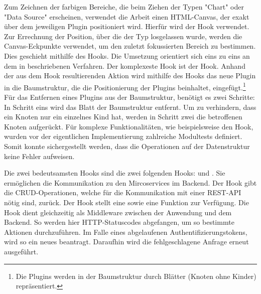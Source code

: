 Zum Zeichnen der farbigen Bereiche, die beim Ziehen der Typen "Chart" oder "Data Source" erscheinen,
verwendet die Arbeit einen HTML-Canvas, der exakt über dem jeweiligen Plugin positioniert wird.
Hierfür wird der  Hook verwendet. Zur Errechnung der Position, über die der Typ
losgelassen wurde, werden die Canvas-Eckpunkte verwendet, um den zuletzt fokussierten Bereich zu bestimmen.
Dies geschieht mithilfe des  Hooks. Die Umsetzung orientiert sich eins zu eins an dem
in  beschriebenen Verfahren. Der komplexeste Hook ist der
 Hook. Anhand der aus dem  Hook resultierenden Aktion wird
mithilfe des  Hooks das neue Plugin in die Baumstruktur, die die Positionierung
der Plugins beinhaltet, eingefügt.\footnote{Die Plugins werden in der Baumstruktur durch Blätter (Knoten ohne Kinder) repräsentiert.}
Für das Entfernen eines Plugins aus der Baumstruktur, benötigt es zwei Schritte: In Schritt eins wird
das Blatt der Baumstruktur entfernt. Um zu verhindern, dass ein Knoten nur ein einzelnes Kind hat,
werden in Schritt zwei die betroffenen Knoten aufgerückt. Für komplexe Funktionalitäten, wie beispielsweise
den  Hook, wurden vor der eigentlichen Implementierung zahlreiche Modultests definiert.
Somit konnte sichergestellt werden, dass die Operationen auf der Datenstruktur keine Fehler aufweisen.

Die zwei bedeutsamsten Hooks sind die zwei folgenden Hooks:  und . Sie ermöglichen
die Kommunikation zu den Mircoservices im Backend. Der  Hook gibt die CRUD-Operationen,
welche für die Kommunikation mit einer REST-API nötig sind, zurück. Der  Hook
stellt eine  sowie eine  Funktion zur Verfügung. Die  Hook
dient gleichzeitig als Middleware zwischen der Anwendung und dem Backend. So werden hier HTTP-Statuscodes
abgefangen, um so bestimmte Aktionen durchzuführen. Im Falle eines abgelaufenen Authentifizierungstokens,
wird so ein neues beantragt. Daraufhin wird die fehlgeschlagene Anfrage erneut ausgeführt.

